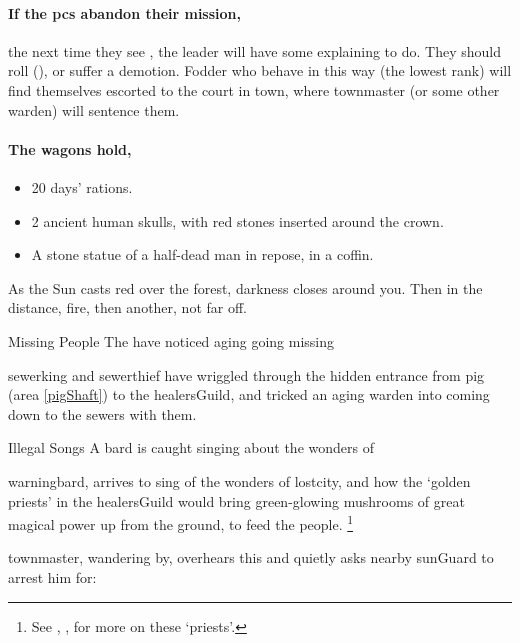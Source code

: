 \paragraph{If the \glspl{pc} abandon their mission,}
the next time they see , the leader will have some explaining to do.
They should roll  (\tn[12]), or suffer a demotion.
Fodder who behave in this way (the lowest rank) will find themselves escorted to the \gls{court} in \gls{town}, where \gls{townmaster} (or some other \gls{warden}) will sentence them.%

\paragraph{The wagons hold,}

\begin{itemize}
  \item
  20 days' rations.
  \item
  2 ancient human skulls, with red stones inserted around the crown.
  \label{skullCrown}
  \item
  A stone statue of a half-dead man in repose, in a coffin.
\end{itemize}

\begin{boxtext}
  As the Sun casts red over the forest, darkness closes around you.
  Then in the distance, fire, then another, not far off.
\end{boxtext}

  {Missing People}%
  {The  have noticed aging  going missing}%

\Gls{sewerking} and \gls{sewerthief} have wriggled through the hidden entrance from \gls{pig} (area \vref{pigShaft}) to the \gls{healersGuild}, and tricked an aging \gls{warden} into coming down to the sewers with them.

{Illegal Songs}%
{A bard is caught singing about the wonders of }%

\Gls{warningbard}, arrives to sing of the wonders of \gls{lostcity}, and how the `golden priests' in the \gls{healersGuild} would bring green-glowing mushrooms of great magical power up from the ground, to feed the people.%
\footnote{See , , for more on these `priests'.}

\Gls{townmaster}, wandering by, overhears this and quietly asks nearby \gls{sunGuard} to arrest him for:


